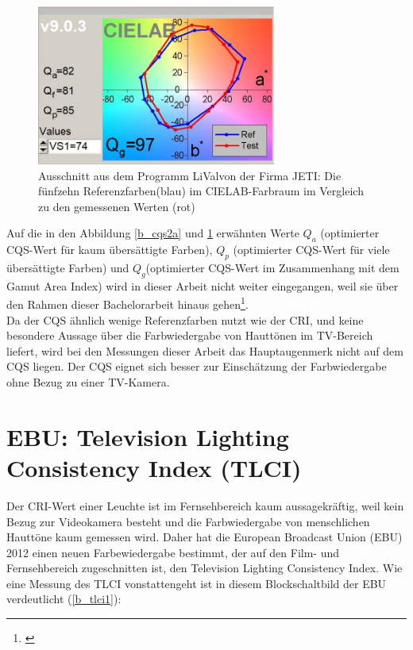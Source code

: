 \begin{figure}[htp]     %
\centering
\includegraphics[width=0.7\textwidth]{bilder/cqs2b} 
\caption {Ausschnitt aus dem Programm \glqq LiVal\grqq von der Firma JETI: Die fünfzehn Referenzfarben(blau) im CIELAB-Farbraum im Vergleich zu den gemessenen Werten (rot)}\label{b_cqs2b}
\end{figure}

Auf die in den Abbildung \ref{b_cqs2a} und \ref{b_cqs2b} erwähnten Werte $Q_{a}$ (optimierter CQS-Wert für kaum übersättigte Farben), $Q_{p}$ (optimierter CQS-Wert für viele übersättigte Farben) und $Q_{g}$(optimierter CQS-Wert im Zusammenhang mit dem Gamut Area Index) wird in dieser Arbeit nicht weiter eingegangen, weil sie über den Rahmen dieser Bachelorarbeit hinaus gehen\footnote{\cite[60-62]{khanh}}. \\
Da der CQS ähnlich wenige Referenzfarben nutzt wie der CRI, und keine besondere Aussage über die Farbwiedergabe von Hauttönen im TV-Bereich liefert, wird bei den Messungen dieser Arbeit das Hauptaugenmerk nicht auf dem CQS liegen. Der CQS eignet sich besser zur Einschätzung der Farbwiedergabe ohne Bezug zu einer TV-Kamera. 


\newpage 
\section{EBU: Television Lighting Consistency Index (TLCI)} \label{sec_tlci}
Der CRI-Wert einer Leuchte ist im Fernsehbereich kaum aussagekräftig, weil kein Bezug zur Videokamera besteht und die Farbwiedergabe von menschlichen Hauttöne kaum gemessen wird. Daher hat die European Broadcast Union (EBU) 2012 einen neuen Farbewiedergabe bestimmt, der auf den Film- und Fernsehbereich zugeschnitten ist, den Television Lighting Consistency Index.  
Wie eine Messung des TLCI vonstattengeht ist in diesem Blockschaltbild der EBU verdeutlicht (\ref{b_tlci1}):

